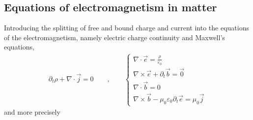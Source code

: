 \documentclass[letterpaper,10pt,english]{jupyterBook}
\begin{document}
\subsection{Equations of electromagnetism in matter}
\label{\detokenize{ch/principles-matter:equations-of-electromagnetism-in-matter}}\label{\detokenize{ch/principles-matter:classical-electromagnetism-media-vacuum-to-matter}}
\sphinxAtStartPar
Introducing the splitting of free and bound charge and current into the equations of the electromagnetism, namely electric charge continuity and Maxwell’s equations,
\begin{equation*}
\begin{split}
\partial_t \rho + \nabla \cdot \vec{j} = 0
\qquad , \qquad
\begin{cases}
\nabla \cdot \vec{e} = \frac{\rho}{\varepsilon_0} \\
\nabla \times \vec{e} + \partial_t \vec{b} = \vec{0} \\
\nabla \cdot \vec{b} = 0 \\
\nabla \times \vec{b} - \mu_0 \varepsilon_0 \partial_t \vec{e} = \mu_0 \vec{j}
\end{cases}\end{split}
\end{equation*}
\sphinxAtStartPar
and more precisely
\end{document}
